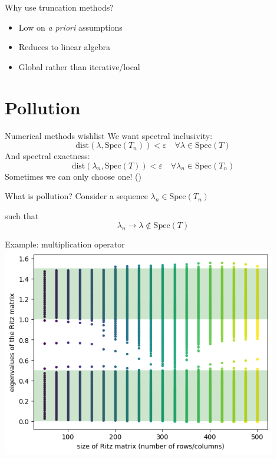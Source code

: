 \documentclass[14pt]{beamer}
\newcommand{\Spec}{\mathrm{Spec}} %
\newcommand{\dist}{\mathrm{dist}} %
\begin{document}
\begin{frame}{Why use truncation methods?}
  \begin{itemize}
    \item Low on \emph{a priori} assumptions
    \item Reduces to linear algebra
    \item Global rather than iterative/local
  \end{itemize}
\end{frame}

\section{Pollution}
\begin{frame}{Numerical methods wishlist}
  We want spectral inclusivity:
  $$\dist(\lambda, \Spec(T_n)) < \varepsilon \quad \forall \lambda \in \Spec(T)$$
  And spectral exactness:
  $$\dist(\lambda_n, \Spec(T)) < \varepsilon \quad \forall \lambda_n \in \Spec(T_n)$$
  Sometimes we can only choose one! (\textcite{colbrook2019how})
\end{frame}

\begin{frame}{What is pollution?}
  \centering
  Consider a sequence $\lambda_n \in \Spec(T_n)$

  such that
  $$\lambda_n \rightarrow \lambda \notin \Spec(T)$$
\end{frame}

\begin{frame}{Example: multiplication operator}
  \includegraphics[width=0.9\textwidth]{mult-op-spec}
\end{frame}
\end{document}
